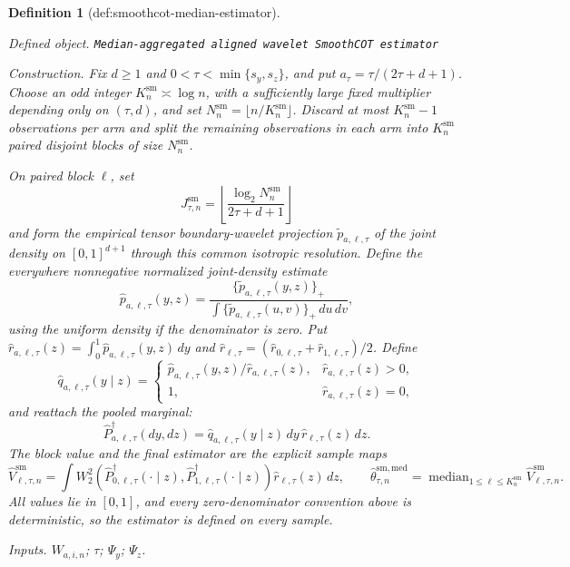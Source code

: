 \documentclass{article}
\newtheorem{definition}{Definition}
\begin{document}
\begin{definition}[def:smoothcot-median-estimator]\label{def:smoothcot-median-estimator}
\par\smallskip\noindent\emph{Defined object.} \texttt{Median-\allowbreak{}aggregated aligned wavelet SmoothCOT estimator}
\par\smallskip\noindent\emph{Construction.} Fix \(d\ge1\) and \(0<\tau<\min\{s_y,s_z\}\), and put \(a_\tau=\tau/(2\tau+d+1)\). Choose an odd integer \(K_n^{\mathrm{sm}}\asymp\log n\), with a sufficiently large fixed multiplier depending only on \((\tau,d)\), and set \(N_n^{\mathrm{sm}}=\lfloor n/K_n^{\mathrm{sm}}\rfloor\). Discard at most \(K_n^{\mathrm{sm}}-1\) observations per arm and split the remaining observations in each arm into \(K_n^{\mathrm{sm}}\) paired disjoint blocks of size \(N_n^{\mathrm{sm}}\).

On paired block \(\ell\), set
\[
J_{\tau,n}^{\mathrm{sm}}=
\left\lfloor\frac{\log_2 N_n^{\mathrm{sm}}}{2\tau+d+1}\right\rfloor
\]
and form the empirical tensor boundary-wavelet projection \(\widetilde p_{a,\ell,\tau}\) of the joint density on \([0,1]^{d+1}\) through this common isotropic resolution. Define the everywhere nonnegative normalized joint-density estimate
\[
\widehat p_{a,\ell,\tau}(y,z)=
\frac{\{\widetilde p_{a,\ell,\tau}(y,z)\}_+}
{\int\{\widetilde p_{a,\ell,\tau}(u,v)\}_+\,du\,dv},
\]
using the uniform density if the denominator is zero. Put \(\widehat r_{a,\ell,\tau}(z)=\int_0^1\widehat p_{a,\ell,\tau}(y,z)\,dy\) and \(\widehat r_{\ell,\tau}=(\widehat r_{0,\ell,\tau}+\widehat r_{1,\ell,\tau})/2\). Define
\[
\widehat q_{a,\ell,\tau}(y\mid z)=
\begin{cases}
\widehat p_{a,\ell,\tau}(y,z)/\widehat r_{a,\ell,\tau}(z),&\widehat r_{a,\ell,\tau}(z)>0,\\
1,&\widehat r_{a,\ell,\tau}(z)=0,
\end{cases}
\]
and reattach the pooled marginal:
\[
\widehat P_{a,\ell,\tau}^{\dagger}(dy,dz)
=\widehat q_{a,\ell,\tau}(y\mid z)\,dy\,\widehat r_{\ell,\tau}(z)\,dz.
\]
The block value and the final estimator are the explicit sample maps
\[
\widehat V_{\ell,\tau,n}^{\mathrm{sm}}
=\int W_2^2\!\left(\widehat P_{0,\ell,\tau}^{\dagger}(\cdot\mid z),
\widehat P_{1,\ell,\tau}^{\dagger}(\cdot\mid z)\right)
\widehat r_{\ell,\tau}(z)\,dz,
\qquad
\widehat\theta^{\mathrm{sm,med}}_{\tau,n}
=\operatorname{median}_{1\le\ell\le K_n^{\mathrm{sm}}}
\widehat V_{\ell,\tau,n}^{\mathrm{sm}}.
\]
All values lie in \([0,1]\), and every zero-denominator convention above is deterministic, so the estimator is defined on every sample.
\par\smallskip\noindent\emph{Inputs.} \(W_{a,i,n}\); \(\tau\); \(\Psi_y\); \(\Psi_z\).
\end{definition}
\end{document}
